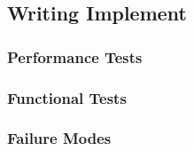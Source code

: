 
\subsection{Writing Implement}
\label{sec:verification_writing_implement}


\subsubsection{Performance Tests}
\label{sec:writing_pt}

\subsubsection{Functional Tests}
\label{sec:writing_ft}

\subsubsection{Failure Modes}
\label{sec:writing_fm}